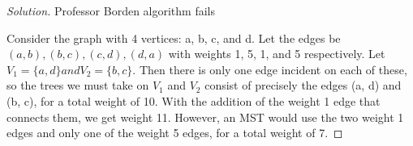 \documentclass[12pt]{article}
\begin{document}
\begin{enumerate}
\begin{proof}[Solution]
	Professor Borden algorithm fails 
	
	Consider the graph with 4 vertices: a, b, c,
and d. Let the edges be $(a, b),(b, c),(c, d),(d, a)$ with weights 1, 5, 1, and 5
respectively. Let $V_1 = \{a, d\} and V_2 = \{b, c\}.$ Then there is only one edge
incident on each of these, so the trees we must take on $V_1$ and $V_2$ consist of
precisely the edges (a, d) and (b, c), for a total weight of 10. With the addition
of the weight 1 edge that connects them, we get weight 11. However, an MST
would use the two weight 1 edges and only one of the weight 5 edges, for a total
weight of 7.
\end{proof}
         
         \end{enumerate}
\end{document}
